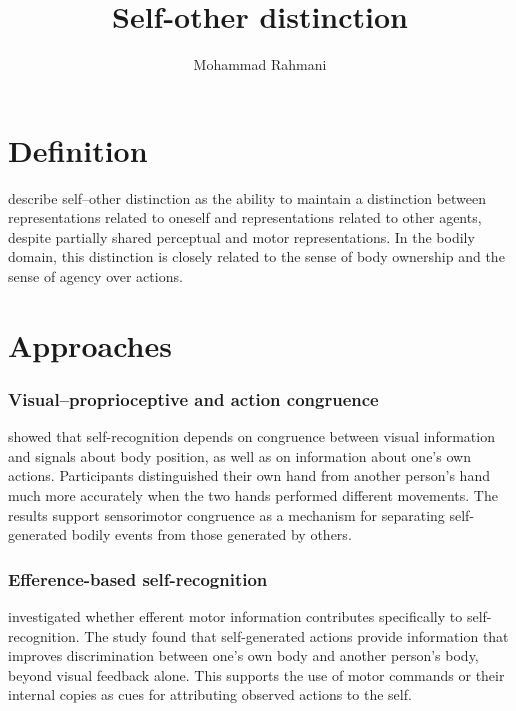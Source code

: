 \documentclass[a4paper]{article}
\title{Self-other distinction}
\date{}
\author{Mohammad Rahmani}
\begin{document}
   \maketitle

   \section{Definition}
         \cite{decety-2003-shared-representations-between-self-and-other,tsakiris-2007-on-agency-and-body-ownership} describe self--other distinction as the ability to maintain a distinction between representations related to oneself and representations related to other agents, despite partially shared perceptual and motor representations. In the bodily domain, this distinction is closely related to the sense of body ownership and the sense of agency over actions.

   \section{Approaches}

         \subsubsection{Visual--proprioceptive and action congruence}
            \cite{van-den-bos-2002-sense-of-body-and-sense-of-action-both-contribute-to-self-recognition} showed that self-recognition depends on congruence between visual information and signals about body position, as well as on information about one's own actions. Participants distinguished their own hand from another person's hand much more accurately when the two hands performed different movements. The results support sensorimotor congruence as a mechanism for separating self-generated bodily events from those generated by others.

         \subsubsection{Efference-based self-recognition}
            \cite{tsakiris-2005-a-specific-role-for-efferent-information-in-self-recognition} investigated whether efferent motor information contributes specifically to self-recognition. The study found that self-generated actions provide information that improves discrimination between one's own body and another person's body, beyond visual feedback alone. This supports the use of motor commands or their internal copies as cues for attributing observed actions to the self.
\end{document}
